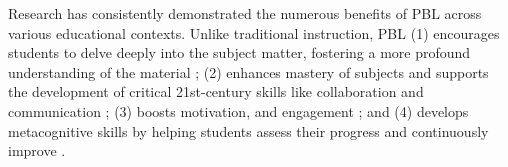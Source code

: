 Research has consistently demonstrated the numerous benefits of PBL across various educational contexts. Unlike traditional instruction, PBL (1) encourages students to delve deeply into the subject matter, fostering a more profound understanding of the material \cite{boaler1998open, panasan2010learning, schneider2002performance, chen2019revisiting}; (2) enhances mastery of subjects and supports the development of critical 21st-century skills like collaboration and communication \cite{condliffe2017project, noguera2015equal, peterson2012uncovering, chen2019revisiting}; (3) boosts motivation, and engagement \cite{hernandez2009learning,kaldi2011project, blumenfeld1991motivating, holm2011project, bender2012project, intel2007designing}; %
and (4) develops metacognitive skills by helping students assess their progress and continuously improve \cite{thomas1998project, thomas1999project, english2013supporting, bender2012project, tseng2013attitudes}. %


